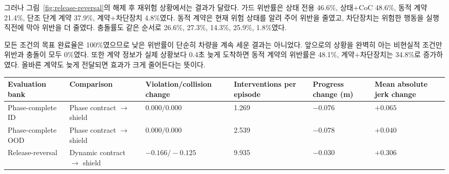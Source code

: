 그러나 그림~\ref{fig:release-reversal}의 해제 후 재위험 상황에서는 결과가 달랐다. 가드 위반률은 상태 전용 46.6\%, 상태+CoC 48.6\%, 동적 계약 21.4\%, 단조 단계 계약 37.9\%, 계약+차단장치 4.8\%였다. 동적 계약은 현재 위험 상태를 알려 주어 위반을 줄였고, 차단장치는 위험한 행동을 실행 직전에 막아 위반을 더 줄였다. 충돌률도 같은 순서로 26.6\%, 27.3\%, 14.3\%, 25.9\%, 1.8\%였다.


모든 조건의 목표 완료율은 100\%였으므로 낮은 위반률이 단순히 차량을 계속 세운 결과는 아니었다. 앞으로의 상황을 완벽히 아는 비현실적 조건만 위반과 충돌이 모두 0\%였다. 또한 계약 정보가 실제 상황보다 0.4초 늦게 도착하면 동적 계약의 위반률은 48.1\%, 계약+차단장치는 34.8\%로 증가하였다. 올바른 계약도 늦게 전달되면 효과가 크게 줄어든다는 뜻이다.

\begin{table}[!t]
\color{reviewerone}
\centering
{}
\label{tab:shield-cost}
\footnotesize
\begin{tabularx}{\textwidth}{L{0.18\textwidth}L{0.18\textwidth}ZZZZ}
\toprule
Evaluation bank & Comparison & Violation/collision change & Interventions per episode & Progress change (m) & Mean absolute jerk change \\
\midrule
Phase-complete ID & Phase contract $\rightarrow$ shield & $0.000/0.000$ & 1.269 & $-0.076$ & $+0.065$ \\
Phase-complete OOD & Phase contract $\rightarrow$ shield & $0.000/0.000$ & 2.539 & $-0.078$ & $+0.040$ \\
Release-reversal & Dynamic contract $\rightarrow$ shield & $-0.166/-0.125$ & 9.935 & $-0.030$ & $+0.306$ \\
\bottomrule
\end{tabularx}
\end{table}

